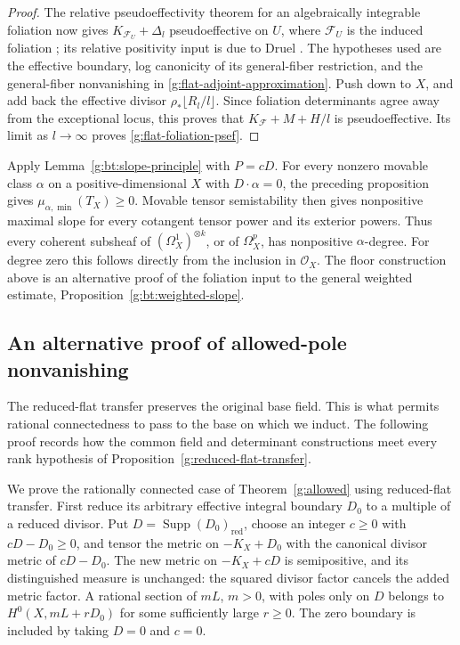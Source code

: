 \begin{proof}
The relative pseudoeffectivity theorem for an algebraically integrable
foliation now gives
\(K_{\mathcal F_U}+\Delta_l\) pseudoeffective on \(U\), where
\(\mathcal F_U\) is the induced foliation
\cite[Proposition~3.1, arXiv version~4]{Ou2023}; its relative positivity
input is due to Druel \cite[Proposition~4.1]{Druel2017}.
The hypotheses used are the effective boundary, log canonicity of its
general-fiber restriction, and the general-fiber nonvanishing in
\eqref{g:flat-adjoint-approximation}.  Push down to \(X\), and add back
the effective divisor \(\rho_*\lfloor R_l/l\rfloor\).  Since foliation
determinants agree away from the exceptional locus, this proves that
\(K_{\mathcal F}+M+H/l\) is pseudoeffective.  Its limit as
\(l\to\infty\) proves \eqref{g:flat-foliation-psef}.

\end{proof}

Apply Lemma~\ref{g:bt:slope-principle} with \(P=cD\).
For every nonzero movable class \(\alpha\) on a positive-dimensional
\(X\) with \(D\cdot\alpha=0\), the preceding proposition gives
\(\mu_{\alpha,\min}(T_X)\ge0\). Movable tensor semistability then gives
nonpositive maximal slope for every cotangent tensor power and its
exterior powers. Thus every coherent subsheaf of
\((\Omega_X^1)^{\otimes k}\), or of \(\Omega_X^p\), has nonpositive
\(\alpha\)-degree. For degree zero this follows directly from the
inclusion in \(\mathcal O_X\). The floor construction above is an
alternative proof of the foliation input to the general weighted
estimate, Proposition~\ref{g:bt:weighted-slope}.

\subsection{An alternative proof of allowed-pole nonvanishing}
\label{g:rc-allowed-poles}

The reduced-flat transfer preserves the original base field.  This is
what permits rational connectedness to pass to the base on which we
induct.  The following proof records how the common field and
determinant constructions meet every rank hypothesis of
Proposition~\ref{g:reduced-flat-transfer}.

We prove the rationally connected case of Theorem~\ref{g:allowed}
using reduced-flat transfer. First reduce its arbitrary effective
integral boundary \(D_0\) to a multiple of a reduced divisor. Put
\(D=\operatorname{Supp}(D_0)_{\mathrm{red}}\), choose an integer
\(c\geq0\) with \(cD-D_0\geq0\), and tensor the metric on
\(-K_X+D_0\) with the canonical divisor metric of \(cD-D_0\).
The new metric on \(-K_X+cD\) is semipositive, and its distinguished
measure is unchanged: the squared divisor factor cancels the added
metric factor. A rational section of \(mL\), \(m>0\), with poles only
on \(D\) belongs to \(H^0(X,mL+rD_0)\) for some sufficiently large
\(r\geq0\).
The zero boundary is included by taking \(D=0\) and \(c=0\).

